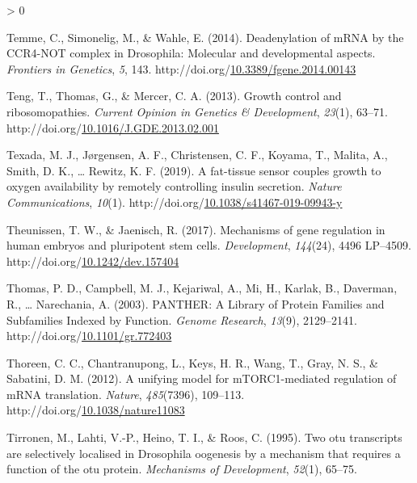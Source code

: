 \documentclass[12pt,oneside]{reedthesis}
\newlength{\cslhangindent}
\newenvironment{CSLReferences}[2] %
 {%
  \setlength{\parindent}{0pt}
  \ifodd #1 \everypar{\setlength{\hangindent}{\cslhangindent}}\ignorespaces\fi
  \ifnum #2 > 0
  \setlength{\parskip}{#2\baselineskip}
  \fi
 }%
 {}
\begin{document}
\begin{CSLReferences}{1}{0}
\leavevmode\hypertarget{ref-Temme2014j}{}%
Temme, C., Simonelig, M., \& Wahle, E. (2014). Deadenylation of {mRNA} by the {CCR4}-{NOT} complex in {Drosophila}: Molecular and developmental aspects. \emph{Frontiers in Genetics}, \emph{5}, 143. http://doi.org/\href{https://doi.org/10.3389/fgene.2014.00143}{10.3389/fgene.2014.00143}

\leavevmode\hypertarget{ref-Teng2013}{}%
Teng, T., Thomas, G., \& Mercer, C. A. (2013). Growth control and ribosomopathies. \emph{Current Opinion in Genetics \& Development}, \emph{23}(1), 63--71. http://doi.org/\href{https://doi.org/10.1016/J.GDE.2013.02.001}{10.1016/J.GDE.2013.02.001}

\leavevmode\hypertarget{ref-Texada2019}{}%
Texada, M. J., Jørgensen, A. F., Christensen, C. F., Koyama, T., Malita, A., Smith, D. K., \ldots{} Rewitz, K. F. (2019). A fat-tissue sensor couples growth to oxygen availability by remotely controlling insulin secretion. \emph{Nature Communications}, \emph{10}(1). http://doi.org/\href{https://doi.org/10.1038/s41467-019-09943-y}{10.1038/s41467-019-09943-y}

\leavevmode\hypertarget{ref-Theunissen2017b}{}%
Theunissen, T. W., \& Jaenisch, R. (2017). Mechanisms of gene regulation in human embryos and pluripotent stem cells. \emph{Development}, \emph{144}(24), 4496 LP--4509. http://doi.org/\href{https://doi.org/10.1242/dev.157404}{10.1242/dev.157404}

\leavevmode\hypertarget{ref-thomasPANTHERLibraryProtein2003}{}%
Thomas, P. D., Campbell, M. J., Kejariwal, A., Mi, H., Karlak, B., Daverman, R., \ldots{} Narechania, A. (2003). {PANTHER}: {A Library} of {Protein Families} and {Subfamilies Indexed} by {Function}. \emph{Genome Research}, \emph{13}(9), 2129--2141. http://doi.org/\href{https://doi.org/10.1101/gr.772403}{10.1101/gr.772403}

\leavevmode\hypertarget{ref-thoreenUnifyingModelMTORC1mediated2012}{}%
Thoreen, C. C., Chantranupong, L., Keys, H. R., Wang, T., Gray, N. S., \& Sabatini, D. M. (2012). A unifying model for {mTORC1}-mediated regulation of {mRNA} translation. \emph{Nature}, \emph{485}(7396), 109--113. http://doi.org/\href{https://doi.org/10.1038/nature11083}{10.1038/nature11083}

\leavevmode\hypertarget{ref-Tirronen1995}{}%
Tirronen, M., Lahti, V.-P., Heino, T. I., \& Roos, C. (1995). Two otu transcripts are selectively localised in {Drosophila} oogenesis by a mechanism that requires a function of the otu protein. \emph{Mechanisms of Development}, \emph{52}(1), 65--75.


\end{CSLReferences}
\end{document}
